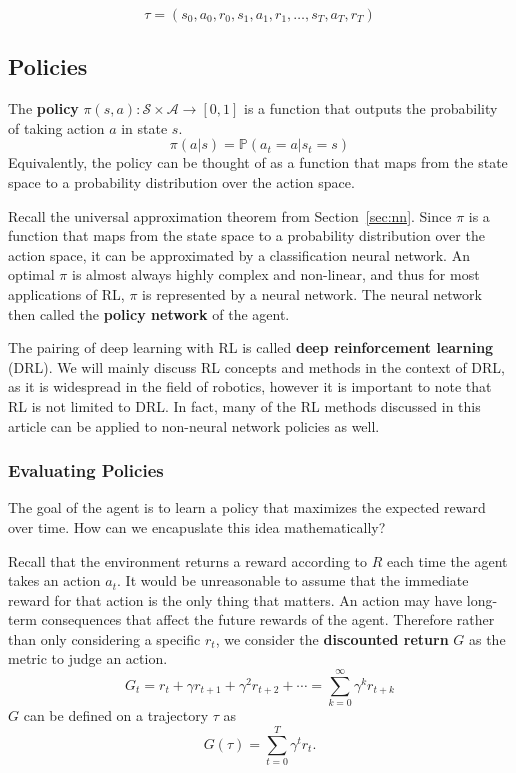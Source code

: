 \documentclass[12pt]{report}
\theoremstyle{definition}
\theoremstyle{remark}
\begin{document}
\begin{equation}
    \tau = (s_0, a_0, r_0, s_1, a_1, r_1, \ldots, s_T, a_T, r_T)
\end{equation}

\subsection{Policies}

The \textbf{policy} $\pi(s, a): \mathcal{S} \times \mathcal{A} \to [0,1]$ is a function that outputs the probability of taking action $a$ in state $s$.
\begin{equation}
    \pi(a | s) = \mathbb{P}(a_t = a | s_t = s)
\end{equation}
Equivalently, the policy can be thought of as a function that maps from the state space to a probability distribution over the action space.

Recall the universal approximation theorem from Section~\ref{sec:nn}. Since $\pi$ is a function that maps from the state space to a probability distribution over the action space, it can be approximated by a classification neural network. An optimal $\pi$ is almost always highly complex and non-linear, and thus for most applications of RL, $\pi$ is represented by a neural network. The neural network then called the \textbf{policy network} of the agent.

The pairing of deep learning with RL is called \textbf{deep reinforcement learning} (DRL). We will mainly discuss RL concepts and methods in the context of DRL, as it is widespread in the field of robotics, however it is important to note that RL is not limited to DRL\@. In fact, many of the RL methods discussed in this article can be applied to non-neural network policies as well.

\subsubsection{Evaluating Policies}
The goal of the agent is to learn a policy that maximizes the expected reward over time. How can we encapuslate this idea mathematically?

Recall that the environment returns a reward according to $R$ each time the agent takes an action $a_t$. It would be unreasonable to assume that the immediate reward for that action is the only thing that matters. An action may have long-term consequences that affect the future rewards of the agent. Therefore rather than only considering a specific $r_t$, we consider the \textbf{discounted return} $G$ as the metric to judge an action.
\begin{equation}
    G_t = r_t + \gamma r_{t+1} + \gamma^2 r_{t+2} + \cdots = \sum_{k=0}^{\infty} \gamma^k r_{t+k}
\end{equation}
$G$ can be defined on a trajectory $\tau$ as
\begin{equation}
    G(\tau) = \sum_{t=0}^{T} \gamma^t r_t.
\end{equation}
\end{document}
